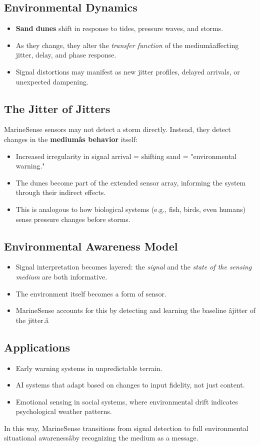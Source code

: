 \documentclass[11pt]{article}
\begin{document}
\subsection{Environmental Dynamics}
\begin{itemize}
  \item \textbf{Sand dunes} shift in response to tides, pressure waves, and storms.
  \item As they change, they alter the \textit{transfer function} of the mediumâaffecting jitter, delay, and phase response.
  \item Signal distortions may manifest as new jitter profiles, delayed arrivals, or unexpected dampening.
\end{itemize}

\subsection{The Jitter of Jitters}
MarineSense sensors may not detect a storm directly. Instead, they detect changes in the \textbf{mediumâs behavior} itself:
\begin{itemize}
  \item Increased irregularity in signal arrival = shifting sand = "environmental warning."
  \item The dunes become part of the extended sensor array, informing the system through their indirect effects.
  \item This is analogous to how biological systems (e.g., fish, birds, even humans) sense pressure changes before storms.
\end{itemize}

\subsection{Environmental Awareness Model}
\begin{itemize}
  \item Signal interpretation becomes layered: the \textit{signal} and the \textit{state of the sensing medium} are both informative.
  \item The environment itself becomes a form of sensor.
  \item MarineSense accounts for this by detecting and learning the baseline âjitter of the jitter.â
\end{itemize}

\subsection{Applications}
\begin{itemize}
  \item Early warning systems in unpredictable terrain.
  \item AI systems that adapt based on changes to input fidelity, not just content.
  \item Emotional sensing in social systems, where environmental drift indicates psychological weather patterns.
\end{itemize}

In this way, MarineSense transitions from signal detection to full environmental situational awarenessâby recognizing the medium as a message.
\end{document}
